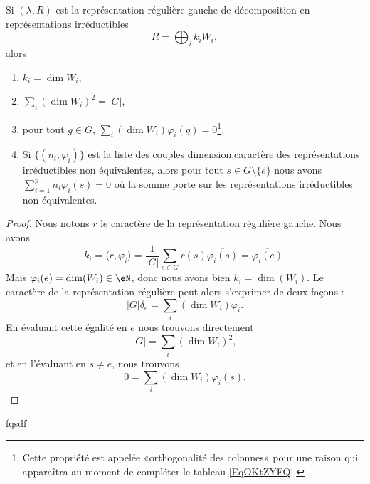 \begin{proposition} \label{PropYLnxIjk}
	Si \( (\lambda,R)\) est la représentation régulière gauche de décomposition en représentations irréductibles
	\begin{equation}
		R=\bigoplus_ik_iW_i,
	\end{equation}
	alors
	\begin{enumerate}
		\item
		      \( k_i=\dim W_i\),
		\item       \label{ITEMooLXIJooDxkGJh}
		      \( \sum_i(\dim W_i)^2=|G|\),
		\item   \label{ItemEXAjTIh}
		      pour tout \( g\in G\), \( \sum_i(\dim W_i)\varphi_i(g)=0\)\footnote{Cette propriété est appelée «orthogonalité des colonnes» pour une raison qui apparaîtra au moment de compléter le tableau \eqref{EqOKtZYFQ}.}.
		\item
		      Si \( \{ (n_i,\varphi_i) \}\) est la liste des couples dimension,caractère des représentations irréductibles non équivalentes, alors pour tout \( s\in G\setminus\{ e \}\) nous avons \( \sum_{i=1}^pn_i\varphi_i(s)=0\) où la somme porte sur les représentations irréductibles non équivalentes.
	\end{enumerate}
\end{proposition}

\begin{proof}
	Nous notons \( r\) le caractère de la représentation régulière gauche. Nous avons
	\begin{equation}
		k_i=\langle r, \varphi_i\rangle =\frac{1}{ | G | }\sum_{s\in G}r(s)\overline{ \varphi_i(s) }=\overline{ \varphi_i(e) }.
	\end{equation}
	Mais \( \varphi_i(e)=\dim (W_i)\in \eN\), donc nous avons bien \( k_i=\dim(W_i)\). Le caractère de la représentation régulière peut alors s'exprimer de deux façons :
	\begin{equation}
		| G |\delta_e=\sum_i(\dim W_i)\varphi_i.
	\end{equation}
	En évaluant cette égalité en \( e\) nous trouvons directement
	\begin{equation}
		| G |=\sum_i(\dim W_i)^2,
	\end{equation}
	et en l'évaluant en \( s\neq e\), nous trouvons
	\begin{equation}
		0=\sum_i(\dim W_i)\varphi_i(s).
	\end{equation}
\end{proof}

fqsdf

